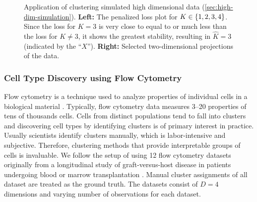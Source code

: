\begin{figure}[tp]
	\centering
	\subfloat{\label{fig:high-dim-stare-loss}\texttt{[image: multiGMM-penloss-rho-n=10000-d=50-legend]}}
	\subfloat{\label{fig:high-dim-true}\texttt{[image: selected-cluster-plot-comparison-K=3]}}

	\caption{Application of \methodname clustering simulated high dimensional data (\cref{sec:high-dim-simulation}).
		\textbf{Left:} The penalized loss plot for $K \in \{1,2,3,4\}$.
		Since the loss for $K=3$ is very close to equal to or much less than the loss for $K \ne 3$, it shows the greatest
		stability, resulting in $\widehat K = 3$ (indicated by the ``$X$'').
		\textbf{Right:} Selected two-dimensional projections of the data.}
	\label{fig:high-dim}
\end{figure}





\subsubsection{Cell Type Discovery using Flow Cytometry}
\label{sec:flow-cytometry}

Flow cytometry is a technique used to analyze properties of individual cells in a biological material \citep{flow_cytometry} .
Typically, flow cytometry data measures 3--20 properties of tens of thousands cells.
Cells from distinct populations tend to fall into clusters and discovering cell types by identifying clusters
is of primary interest in practice.
Usually scientists identify clusters manually, which is labor-intensive and subjective.
Therefore, clustering methods that provide interpretable groups of cells is invaluable.
We follow the setup of \citet{Miller:2019} using 12 flow cytometry datasets originally from a longitudinal study of graft-versus-host disease %
in patients undergoing blood or marrow transplantation \citep{Brinkman:2007}.
Manual cluster assignments of all dataset are treated as the ground truth.
The datasets consist of $D=4$ dimensions and varying number of observations for each dataset.

